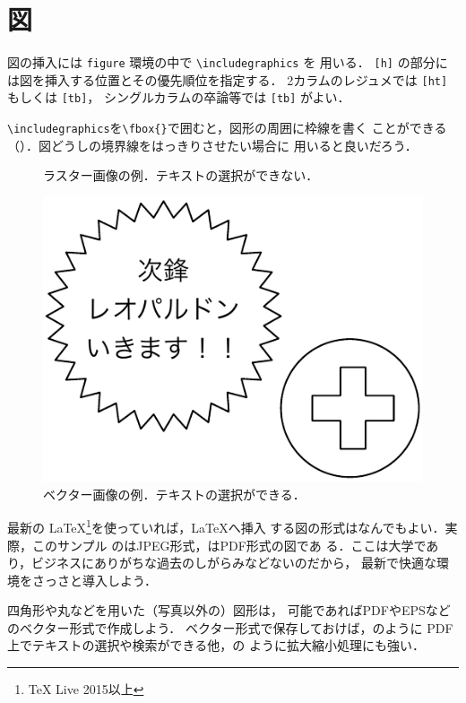 \documentclass[uplatex]{jsarticle}
\begin{document}
\section{図}

図の挿入には \texttt{figure} 環境の中で \verb|\includegraphics| を
用いる．
\texttt{[h]} の部分には図を挿入する位置とその優先順位を指定する．
2カラムのレジュメでは \texttt{[ht]} もしくは \texttt{[tb]}，
シングルカラムの卒論等では \texttt{[tb]} がよい．

\verb|\includegraphics|を\verb|\fbox{}|で囲むと，図形の周囲に枠線を書く
ことができる（）．図どうしの境界線をはっきりさせたい場合に
用いると良いだろう．

\begin{figure}[tb]
  \centering
  \caption{ラスター画像の例．テキストの選択ができない．}
  \label{fig:raster}
\end{figure}

\begin{figure}[tb]
  \centering
  \includegraphics[width=0.4\linewidth]{fig/leo.pdf}
  \caption{ベクター画像の例．テキストの選択ができる．}
  \label{fig:vector}
\end{figure}

最新の \LaTeX\footnote{TeX Live 2015以上}を使っていれば，\LaTeX へ挿入
する図の形式はなんでもよい．実際，このサンプル
のはJPEG形式，はPDF形式の図であ
る．ここは大学であり，ビジネスにありがちな過去のしがらみなどないのだから，
最新で快適な環境をさっさと導入しよう．

四角形や丸などを用いた（写真以外の）図形は，
可能であればPDFやEPSなどのベクター形式で作成しよう．
ベクター形式で保存しておけば，のように
PDF上でテキストの選択や検索ができる他，の
ように拡大縮小処理にも強い．
\end{document}
